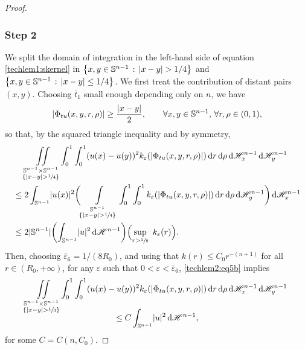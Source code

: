 \documentclass[JEP,XML,SOM,Unicode,published]{cedram}
\newcommand{\sep}{\,:\,}
\numberwithin{equation}{section}
\theoremstyle{plain}
\theoremstyle{definition}
\newcommand{\dd}{\mathop{}\mathopen{}\mathrm{d}}
\newcommand{\dr}{\mathop{}\mathopen{}\mathrm{d}r}
\newcommand{\dH}{\mathop{}\mathopen{}\mathrm{d}\mathscr{H}}
\newcommand{\bbS}{\mathbb{S}}
\let\eps\varepsilon
\let\ol\overline
\DeclarePairedDelimiter{\abs}{\lvert}{\rvert}
\begin{document}
\begin{proof}
\subsubsection*{Step 2}
We split the domain of integration in the left-hand side of equation \cref{techlem1:skernel} in
$\left\{x,y\in\bbS^{n-1}\sep  \abs{x-y}>1/4\right\}$ and $\left\{x,y\in\bbS^{n-1}\sep \abs{x-y}\leq
1/4\right\}$. We first treat the contribution of distant pairs $(x,y)$.
Choosing $\ol{t}_1$ small enough depending only on $n$, we have
\[
\abs{\Phi_{tu}(x,y,r,\rho)}\geq \frac{\abs{x-y}}{2},\qquad\forall x,y\in\bbS^{n-1},\,\forall
r,\rho\in(0,1),
\]
so that, by the squared triangle inequality and by symmetry,
\begin{multline}\label{techlem2:eq5b}
\iint\limits_{\substack{\bbS^{n-1}\times\bbS^{n-1}\\\{\abs{x-y}>\sfrac{1}{4}\}}}
\int_0^1\int_0^1 (u(x)-u(y))^2
k_\eps(\abs{\Phi_{tu}(x,y,r,\rho)})\dr\dd\rho\dH^{n-1}_x\dH^{n-1}_y\\\begin{aligned}
&\leq 2\int_{\bbS^{n-1}} \abs{u(x)}^2
\biggl(\int\limits_{\substack{\bbS^{n-1}\\\{\abs{x-y}>\sfrac{1}{4}\}}}
\int_0^1\int_0^1 k_\eps(\abs{\Phi_{tu}(x,y,r,\rho)})\dr\dd\rho\dH^{n-1}_y
\biggr) \dH_x^{n-1}\\
&\leq 2\abs{\bbS^{n-1}} \biggl(\int_{\bbS^{n-1}} \abs{u}^2\dH^{n-1}\biggr)\Bigl(\sup_{r>\sfrac{1}{8}}~
k_\eps(r)\Bigr).
\end{aligned}
\end{multline}
Then, choosing $\ol{\eps}_6=1/(8R_0)$, and using that
$k(r)\leq C_0r^{-(n+1)}$ for all $r\in(R_0,+\infty)$, for any $\eps$ such that $0<\eps<\ol{\eps}_6$,
\cref{techlem2:eq5b} implies
\begin{multline}\label{techlem2:eq6}
\iint\limits_{\substack{\bbS^{n-1}\times\bbS^{n-1}\\\{\abs{x-y}>\sfrac{1}{4}\}}}
\int_0^1\int_0^1 (u(x)-u(y))^2
k_\eps(\abs{\Phi_{tu}(x,y,r,\rho)})\dr\dd\rho\dH^{n-1}_x\dH^{n-1}_y\\[-10pt]
\leq C\int_{\bbS^{n-1}} \abs{u}^2\dH^{n-1},
\end{multline}
for some $C=C(n,C_0)$.


\end{proof}
\end{document}
